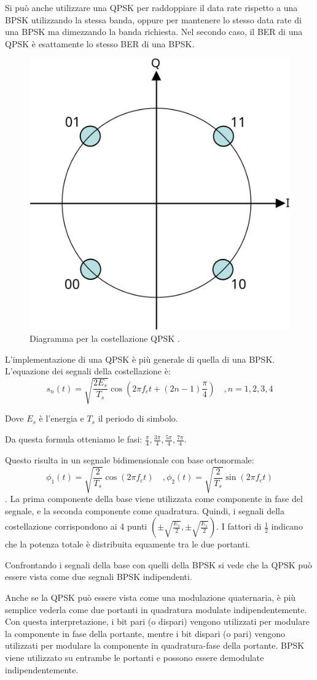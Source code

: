 Si può anche utilizzare una \ac{QPSK} per raddoppiare il data rate rispetto a una \ac{BPSK} utilizzando la stessa banda, oppure per mantenere lo stesso data rate di una \ac{BPSK} ma dimezzando la banda richiesta.
Nel secondo caso, il \ac{BER} di una \ac{QPSK} è esattamente lo stesso \ac{BER} di una \ac{BPSK}.

\begin{figure}[htbp]
  \centering
  \includegraphics[width=0.4\linewidth]{./res/img/qpsk_diagram.png}
  \caption{Diagramma per la costellazione QPSK \cite{wikipedia_phase-shift_nodate}.}
  \label{fig:qpsk-diagram}
\end{figure}

L'implementazione di una \ac{QPSK} è più generale di quella di una \ac{BPSK}.
L'equazione dei segnali della costellazione è:
$$s_n(t) = \sqrt{\frac{2 E_s}{T_s}} \cos(2 \pi f_c t + (2n - 1)\frac{\pi}{4}) \quad , n=1,2,3,4$$

Dove $E_s$ è l'energia e $T_s$ il periodo di simbolo.

Da questa formula otteniamo le fasi: $\frac{\pi}{4},\frac{3\pi}{4},\frac{5\pi}{4},\frac{7\pi}{4}$.

Questo risulta in un segnale bidimensionale con base ortonormale: $$\phi_1(t) = \sqrt{\frac{2}{T_s}} \cos(2 \pi f_c t) \quad, \phi_2(t) = \sqrt{\frac{2}{T_s}} \sin(2 \pi f_c t)$$.
La prima componente della base viene utilizzata come componente in fase del segnale, e la seconda componente come quadratura.
Quindi, i segnali della costellazione corrispondono ai 4 punti $(\pm \sqrt{\frac{E_s}{2}}, \pm \sqrt{\frac{E_s}{2}})$.
I fattori di $\frac{1}{2}$ indicano che la potenza totale è distribuita equamente tra le due portanti.

Confrontando i segnali della base con quelli della \ac{BPSK} si vede che la \ac{QPSK} può essere vista come due segnali \ac{BPSK} indipendenti.

Anche se la \ac{QPSK} può essere vista come una modulazione quaternaria, è più semplice vederla come due portanti in quadratura modulate indipendentemente.
Con questa interpretazione, i bit pari (o dispari) vengono utilizzati per modulare la componente in fase della portante, mentre i bit dispari (o pari) vengono utilizzati per modulare la componente in quadratura-fase della portante.
\ac{BPSK} viene utilizzato su entrambe le portanti e possono essere demodulate indipendentemente.

